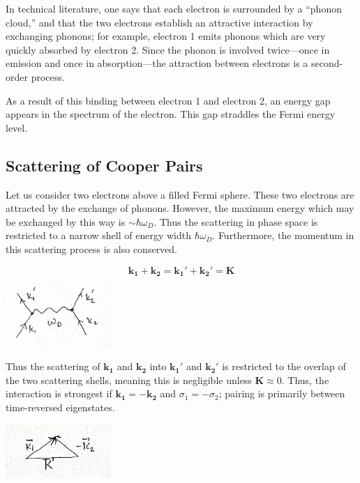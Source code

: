 \documentclass{article}
\begin{document}
In technical literature, one says that each electron is surrounded by a “phonon cloud,” and that the two electrons establish an attractive interaction by exchanging phonons; for example, electron 1 emits phonons which are very quickly absorbed by electron 2. Since the phonon is involved twice—once in emission and once in absorption—the attraction between electrons is a second-order process.

As a result of this binding between electron 1 and electron 2, an energy gap appears in the spectrum of the electron. This gap straddles the Fermi energy level.

\subsection{Scattering of Cooper Pairs}

Let us consider two electrons above a filled Fermi sphere. These two electrons are attracted by the exchange of phonons. However, the maximum energy which may be exchanged by this way is $\sim \hbar \omega_D$. Thus the scattering in phase space is restricted to a narrow shell of energy width $\hbar \omega_D$. Furthermore, the momentum in this scattering process is also conserved.

\[
\mathbf{k_1} + \mathbf{k_2} = \mathbf{k_1'} + \mathbf{k_2'} = \mathbf{K}
\]

\begin{center}
    \includegraphics[width=0.3\textwidth]{figures/scattering_diagram_1.png}
\end{center}

Thus the scattering of $\mathbf{k_1}$ and $\mathbf{k_2}$ into $\mathbf{k_1'}$ and $\mathbf{k_2'}$ is restricted to the overlap of the two scattering shells, meaning this is negligible unless $\mathbf{K} \approx 0$. Thus, the interaction is strongest if $\mathbf{k_1} = -\mathbf{k_2}$ and $\sigma_1 = -\sigma_2$; pairing is primarily between time-reversed eigenstates.

\begin{center}
    \includegraphics[width=0.3\textwidth]{figures/scattering_diagram_2.png}
\end{center}
\end{document}

